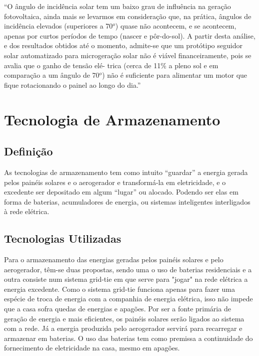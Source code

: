 	“O ângulo de incidência solar tem um baixo grau de influência na geração fotovoltaica, ainda mais se levarmos em consideração que, na prática, ângulos de incidência elevados (superiores a 70$^o$) quase não acontecem, e se acontecem, apenas por curtos períodos de tempo (nascer e pôr-do-sol). A partir desta análise, e dos resultados obtidos até o momento, admite-se que um protótipo seguidor solar automatizado para microgeração solar não é viável financeiramente, pois se avalia que o ganho de tensão elé- trica (cerca de 11\% a pleno sol e em comparação a um ângulo de 70$^o$) não é suficiente para alimentar um motor que fique rotacionando o painel ao longo do dia.” \cite{2011PUCAMP}


\section{Tecnologia de Armazenamento}

\subsection{Definição}

	As tecnologias de armazenamento tem como intuito “guardar” a energia gerada pelos painéis solares e o aerogerador e transformá-la em eletricidade, e o excedente ser depositado em algum “lugar” ou alocado. Podendo ser elas em forma de baterias, acumuladores de energia, ou sistemas inteligentes interligados à rede elétrica.

\subsection{Tecnologias Utilizadas}

	Para o armazenamento das energias geradas pelos painéis solares e pelo aerogerador, têm-se duas propostas, sendo uma o uso de baterias residenciais e a outra consiste num sistema grid-tie em que serve para "jogar" na rede elétrica a energia excedente. Como o sistema grid-tie funciona apenas para fazer uma espécie de troca de energia com a companhia de energia elétrica, isso não impede que a casa sofra quedas de energias e apagões. Por ser a fonte primária de geração de energia e mais eficientes, os painéis solares serão ligados ao sistema com a rede. Já a energia produzida pelo aerogerador servirá para recarregar e armazenar em baterias. O uso das baterias tem como premissa a continuidade do fornecimento de eletricidade na casa, mesmo em apagões.

